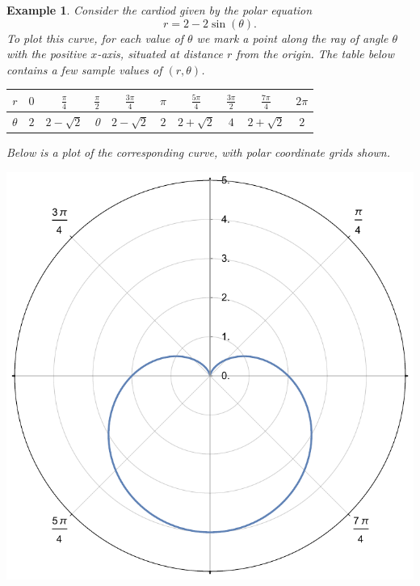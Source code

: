 \documentclass[11pt]{amsart}
\newtheorem{example}{Example}[section]
\numberwithin{equation}{section}
\begin{document}
\begin{example}
Consider the cardiod given by the polar equation
\begin{equation*}
r = 2-2\sin(\theta).
\end{equation*}
To plot this curve, for each value of $\theta$ we mark a point along the ray of angle $\theta$ with the positive $x$-axis, situated at distance $r$ from the origin. The table below contains a few sample values of $(r,\theta)$. 
\begin{center}
{\tabulinesep=1.2mm
\begin{tabu}{|c|c|c|c|c|c|c|c|c|c|}
\hline 
$r$ & $0$ & $\frac{\pi}{4}$ & $\frac{\pi}{2}$ & $\frac{3\pi}{4}$ & $\pi$ & $\frac{5\pi}{4}$ & $\frac{3\pi}{2}$ & $\frac{7\pi}{4}$ & $2\pi$\\ 
\hline 
$\theta$ & $2$  & $2-\sqrt{2}$ & 0 & $2-\sqrt{2}$ & $2$ & $2+\sqrt{2}$ & $4$ & $2+\sqrt{2}$ & $2$\\ 
\hline 
\end{tabu} }
\end{center}

Below is a plot of the corresponding curve, with polar coordinate grids shown.
\begin{center}
\includegraphics[scale=0.5]{polar_p2.pdf}
\end{center}
\end{example}
\end{document}
